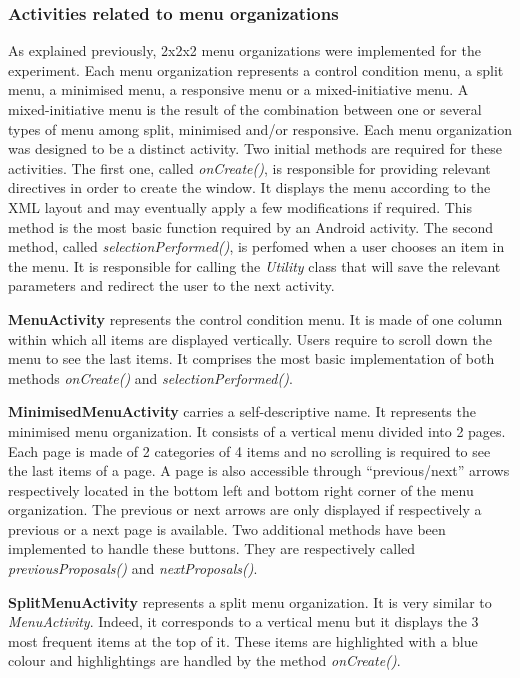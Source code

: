 \subsubsection{Activities related to menu organizations}
As explained previously, 2x2x2 menu organizations were implemented for the 
experiment. Each menu organization represents a control condition menu, a split 
menu, a minimised menu, a responsive menu or a mixed-initiative menu. A 
mixed-initiative menu is the result of the combination between one or several 
types of menu among split, minimised and/or responsive. Each menu organization 
was designed to be a distinct activity. Two initial 
methods are required for these activities. The first one, called 
\textit{onCreate()}, is responsible for providing relevant directives in 
order to create the window. It displays the menu according to the XML layout 
and may eventually apply a few modifications if required. This method is the 
most basic function required by an Android activity. The second method, called 
\textit{selectionPerformed()}, is perfomed when a user chooses an 
item in the menu. It is responsible for calling the \textit{Utility} class 
that will save the relevant parameters and redirect the user to the next 
activity.\newline

\textbf{MenuActivity} represents the control condition menu. It is made of 
one column within which all items are displayed vertically. Users require to 
scroll down the menu to see the last items. It comprises the most basic 
implementation of both methods \textit{onCreate()} and 
\textit{selectionPerformed()}.\newline

\textbf{MinimisedMenuActivity} carries a self-descriptive name. It 
represents the minimised menu organization. It consists of a vertical menu 
divided into 2 pages. Each page is made of 2 categories of 4 items and no 
scrolling is required to see the last items of a page. A page is 
also accessible through \enquote{previous/next} arrows respectively located in 
the bottom left and bottom right corner of the menu organization. The previous 
or next arrows are only displayed if respectively a previous or a next page 
is available. Two additional methods have been implemented to handle these 
buttons. They are respectively called \textit{previousProposals()} and 
\textit{nextProposals()}.\newline

\textbf{SplitMenuActivity} represents a split menu organization. It is very 
similar to \textit{MenuActivity}. Indeed, it corresponds to a 
vertical menu but it displays the 3 most frequent items at the top of it. These 
items are highlighted with a blue colour and highlightings are handled by the 
method \textit{onCreate()}.\newline

